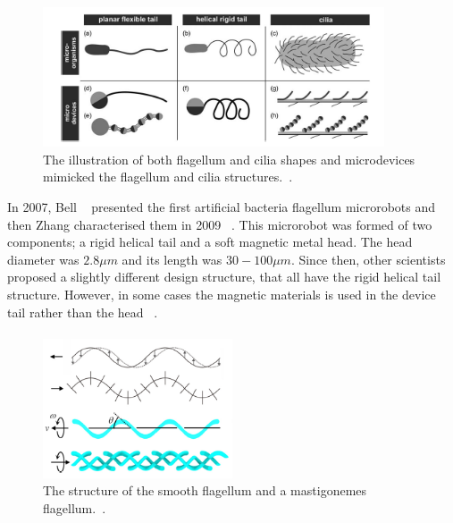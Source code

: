 \documentclass[12pt,a4paper,titlepage]{report}
\begin{document}
\begin{figure}
  \centering
    \includegraphics[width=0.9\textwidth]{cilia}
  \caption{The illustration of both flagellum and cilia shapes and microdevices mimicked the flagellum and cilia 
structures.~\citep{peyer2013bio}.}
  \label{cilia}
\end{figure}

In 2007, Bell ~\citep{gao2013bioinspired} presented the first artificial bacteria flagellum microrobots and then
 Zhang characterised them in 2009 ~\citep{gao2013bioinspired}. This microrobot was formed of two 
components; a rigid helical tail and a soft magnetic metal head. The head diameter 
was $2.8 \mu  m$ and its length was $30-100 \mu m$. Since then, other scientists proposed a slightly different design 
structure, that all have the rigid helical tail structure. However, in some cases the magnetic
 materials is used in the device tail rather than the head ~\citep{gao2013bioinspired}. 
 
\paragraph{}

\begin{figure}
  \begin{center}
    \includegraphics[width=0.5\textwidth]{10}
  \caption{ The structure of the smooth flagellum and a mastigonemes flagellum.~\citep{gao2013bioinspired}.}
  \label{10}
\end{center}
\end{figure}
\end{document}
